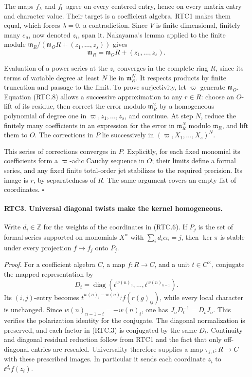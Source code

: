 The maps \(f_\lambda\) and \(f_0\) agree on every centered entry,
hence on every matrix entry and character value.  Their target is a
coefficient algebra.  RTC1 makes them equal, which forces
\(\lambda=0\), a contradiction.  Since \(V\) is finite
dimensional, finitely many \(e_a\), now denoted \(z_i\), span it.
Nakayama's lemma applied to the finite module
\(\mathfrak m_R/(\mathfrak m_OR+(z_1,\ldots,z_s))\) gives
\[
 \mathfrak m_R=\mathfrak m_OR+(z_1,\ldots,z_s).
                                                        \tag{RTC.8}
\]

Evaluation of a power series at the \(z_i\) converges in the
complete ring \(R\), since its terms of variable degree at least
\(N\) lie in \(\mathfrak m_R^N\).  It respects products by
finite truncation and passage to the limit.  To prove surjectivity,
let \(\varpi\) generate \(\mathfrak m_O\).  Equation (RTC.8)
allows a successive approximation to any \(r\in R\): choose an
\(O\)-lift of its residue, then correct the error modulo
\(\mathfrak m_R^2\) by a homogeneous polynomial of degree one
in \(\varpi,z_1,\ldots,z_s\), and continue.  At step \(N\),
reduce the finitely many coefficients in an expression for the error
in \(\mathfrak m_R^N\) modulo \(\mathfrak m_R\), and lift them
to \(O\).  The corrections in \(P\) lie successively in
\((\varpi,X_1,\ldots,X_s)^N\).

This series of corrections converges in \(P\).  Explicitly, for
each fixed monomial its coefficients form a \(\varpi\)-adic
Cauchy sequence in \(O\); their limits define a formal series,
and any fixed finite total-order jet stabilizes to the required
precision.  Its image is \(r\), by separatedness of \(R\).
The same argument covers an empty list of coordinates. \hfill\(\square\)

\paragraph{RTC3. Universal diagonal twists make the kernel homogeneous.}
\label{claim:RTC3}
Write \(d_i\in\mathbb Z\) for the weights of the coordinates in
(RTC.6).  If \(P_j\) is the set of formal series supported on
monomials \(X^\alpha\) with \(\sum_i d_i\alpha_i=j\), then
\(\ker\pi\) is stable under every projection
\(f\mapsto f_j\) onto \(P_j\).

\emph{Proof.}
For a coefficient algebra \(C\), a map \(f:R\to C\), and a
unit \(t\in C^\times\), conjugate the mapped representation by
\[
 D_t=\operatorname{diag}(t^{w(n)_0},\ldots,t^{w(n)_{n-1}}).
\]
Its \((i,j)\)-entry becomes
\(t^{w(n)_i-w(n)_j} f(r(g)_{ij})\), while every local character
is unchanged.  Since \(w(n)_{n-1-i}=-w(n)_i\), one has
\(J_nD_t^{-1}=D_tJ_n\).  This verifies the polarization identity
for the conjugate.  The diagonal normalization is preserved, and
each factor in (RTC.3) is conjugated by the same \(D_t\).
Continuity and diagonal residual reduction follow from RTC1 and the
fact that only off-diagonal entries are rescaled.  Universality
therefore supplies a map \(\tau_{f,t}:R\to C\) with these
prescribed images.  In particular it sends each coordinate \(z_i\)
to \(t^{d_i}f(z_i)\).


